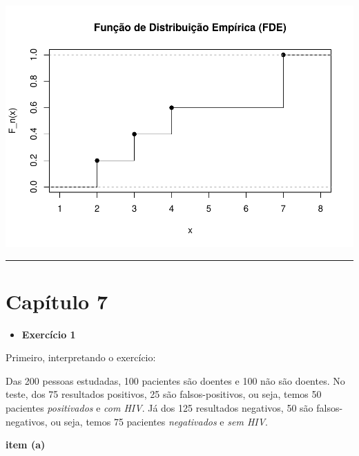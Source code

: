 \documentclass[
]{book}
\providecommand{\tightlist}{%
  \setlength{\itemsep}{0pt}\setlength{\parskip}{0pt}}
\begin{document}
\begin{center}\includegraphics{AED_files/figure-latex/cap6_ex4c-1} \end{center}

\begin{center}\rule{0.5\linewidth}{0.5pt}\end{center}

\section{Capítulo 7}\label{capuxedtulo-7}

\begin{itemize}
\tightlist
\item
  \textbf{Exercício 1}
\end{itemize}

Primeiro, interpretando o exercício:

Das 200 pessoas estudadas, 100 pacientes são doentes e 100 não são doentes. No teste, dos 75 resultados positivos, 25 são falsos-positivos, ou seja, temos 50 pacientes \emph{positivados} e \emph{com HIV}. Já dos 125 resultados negativos, 50 são falsos-negativos, ou seja, temos 75 pacientes \emph{negativados} e \emph{sem HIV}.

\textbf{item (a)}
\end{document}
